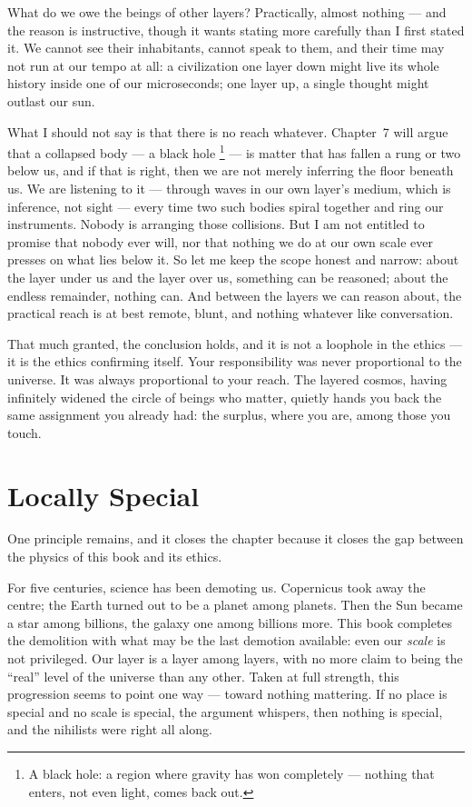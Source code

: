 \documentclass[fontsize=11pt,paper=a4,pagesize=auto,parskip=half-]{scrbook}
\newcommand{\Ixtmp}{}
\DeclareRobustCommand{\Ix}[1]{%
  #1%
  \begingroup
    \lowercase{\gdef\Ixtmp{#1}}%
    \expandafter\index\expandafter{\Ixtmp}%
  \endgroup}
\begin{document}
What do we owe the beings of other layers? Practically, almost nothing --- and the reason is instructive, though it wants stating more carefully than I first stated it. We cannot see their inhabitants, cannot speak to them, and their time may not run at our tempo at all: a civilization one layer down might live its whole history inside one of our microseconds; one layer up, a single thought might outlast our sun.

What I should not say is that there is no reach whatever. Chapter~7 will argue that a collapsed body --- a \Ix{black hole}\footnote{A black hole: a region where gravity has won completely --- nothing that enters, not even light, comes back out.} --- is matter that has fallen a rung or two below us, and if that is right, then we are not merely inferring the floor beneath us. We are listening to it --- through waves in our own layer's medium, which is inference, not sight --- every time two such bodies spiral together and ring our instruments. Nobody is arranging those collisions. But I am not entitled to promise that nobody ever will, nor that nothing we do at our own scale ever presses on what lies below it. So let me keep the scope honest and narrow: about the layer under us and the layer over us, something can be reasoned; about the endless remainder, nothing can. And between the layers we can reason about, the practical reach is at best remote, blunt, and nothing whatever like conversation.

That much granted, the conclusion holds, and it is not a loophole in the ethics --- it is the ethics confirming itself. Your responsibility was never proportional to the universe. It was always proportional to your reach. The layered cosmos, having infinitely widened the circle of beings who matter, quietly hands you back the same assignment you already had: the surplus, where you are, among those you touch.

\section{Locally Special}

One principle remains, and it closes the chapter because it closes the gap between the physics of this book and its ethics.

For five centuries, science has been demoting us. Copernicus took away the centre; the Earth turned out to be a planet among planets. Then the Sun became a star among billions, the galaxy one among billions more. This book completes the demolition with what may be the last demotion available: even our \emph{scale} is not privileged. Our layer is a layer among layers, with no more claim to being the ``real'' level of the universe than any other. Taken at full strength, this progression seems to point one way --- toward nothing mattering. If no place is special and no scale is special, the argument whispers, then nothing is special, and the nihilists were right all along.
\end{document}
